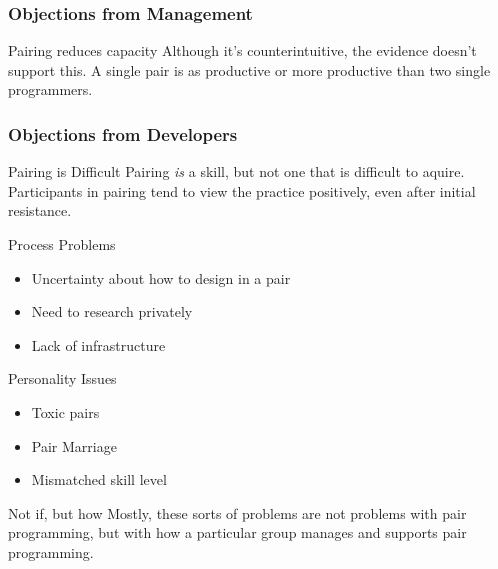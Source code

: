 \begin{frame}
  \frametitle{Objections from Management}
  \begin{block}{Pairing reduces capacity}
  Although it's counterintuitive, the evidence doesn't support this. A single pair is as productive or more productive than two single programmers.
  \end{block}
\end{frame}

\begin{frame}[allowframebreaks]
  \frametitle{Objections from Developers}
  \begin{block}{Pairing is Difficult}
  Pairing {\em is} a skill, but not one that is difficult to aquire\cite{Mendes:2005:IPN:1151954.1067526}. Participants in pairing tend to view the practice positively, even after initial resistance\cite{Begel:2008:PPW:1414004.1414026}.
  \end{block}
  \begin{block}{Process Problems}
  \begin{itemize}
  \item Uncertainty about how to design in a pair
  \item Need to research privately
  \item Lack of infrastructure
  \end{itemize}
  \end{block}
  \begin{block}{Personality Issues}
  \begin{itemize}
  \item Toxic pairs
  \item Pair Marriage
  \item Mismatched skill level
  \end{itemize}
  \end{block}
  \begin{block}{Not if, but how}
  Mostly, these sorts of problems are not problems with pair programming, but with how a particular group manages and supports pair programming.
  \end{block}
\end{frame}
